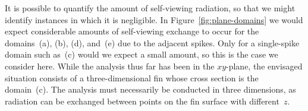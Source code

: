It is possible to quantify the amount of self-viewing radiation,
so that we might identify instances in which it is negligible.
In Figure~\ref{fig:plane-domains} we would expect
considerable amounts of self-viewing exchange
to occur for the domains~(a), (b), (d), and~(e)
due to the adjacent spikes.
Only for a single-spike domain such as~(c)
would we expect a small amount,
so this is the case we consider here.
While the analysis thus far has been in the $xy$-plane,
the envisaged situation consists of a three-dimensional fin
whose cross section is the domain~(c).
The analysis must necessarily be conducted in three dimensions,
as radiation can be exchanged between points on the fin surface
with different~$z$.

\begin{figure}
\end{figure}

